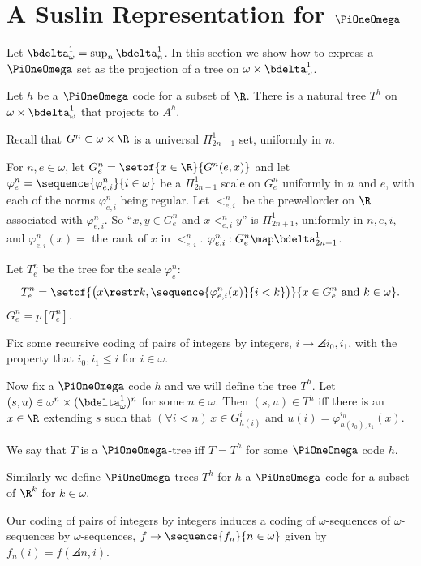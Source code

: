 \documentclass[oneside,12pt]{amsart}
\begin{document}
\section{A Suslin Representation for $\PiOneOmega$}
\label{section:suslinrep}

Let $\bdelta^1_{\omega} = \sup_n \bdelta^1_n$. In this section we show how to
express a $\PiOneOmega$ set as the projection
of a tree on $\omega\times \bdelta^1_{\omega}$.

\begin{definition}
Let $h$ be a $\PiOneOmega$ code for a subset of $\R$.
There is a natural tree $T^{h}$ on $\omega\times\bdelta^1_{\omega}$ that projects to $A^h$.

Recall that $G^n\subset\omega\times\R$ is a universal $\Pi^1_{2n+1}$ set, uniformly in $n$.

For $n,e\in\omega$, let $G^n_e = \setof{x\in\R}{G^n(e, x)}$ and
let $\varphi^n_e = \sequence{\varphi^n_{e,i}}{i\in\omega}$ be a $\Pi^1_{2n+1}$ scale on $G^n_e$ uniformly in $n$ and $e$,
with each of the norms $\varphi^n_{e,i}$ being regular.
Let $<^n_{e,i}$ be the prewellorder on $\R$ associated with $\varphi^n_{e,i}$. So ``$x,y\in G^n_e$ and $x <^n_{e,i} y$'' is
$\Pi^1_{2n+1}$, uniformly in $n,e,i$, and $\varphi^n_{e,i}(x) = $ the rank of $x$ in $<^n_{e,i}$.
$\varphi^n_{e,i} : G^n_e \map \bdelta^1_{2n+1}$.

Let $T^n_e$ be the tree for the scale $\varphi^n_e$:
$$T^n_e = \setof{\left(x\restr k,\sequence{\varphi^n_{e,i}(x)}{i<k}\right)}{x\in G^n_e \text{ and } k\in\omega}.$$
$G^n_e=p[T^n_e]$.

Fix some recursive coding of pairs of integers by integers, $i\to\angles{i_0,i_1}$,
with the property that $i_0,i_1\leq i$ for $i\in\omega$.

Now fix a $\PiOneOmega$ code $h$ and we will define the tree $T^h$.
Let $(s,u) \in \omega^n\times(\bdelta^1_{\omega})^n$ for some $n\in\omega$. Then $(s,u)\in T^h$ iff there is an
$x\in\R$ extending $s$ such that $(\forall i<n)\, x\in G^{i}_{h(i)}$ and
$u(i)=\varphi^{i_0}_{h(i_0),i_1}(x)$.

We say that $T$ is a $\PiOneOmega$-tree iff $T=T^h$ for some $\PiOneOmega$ code $h$.

Similarly we define $\PiOneOmega$-trees $T^h$ for $h$ a $\PiOneOmega$ code for a
subset of $\R^k$ for $k\in\omega$.
\end{definition}

Our coding of pairs of integers by integers induces a coding of $\omega$-sequences of $\omega$-sequences
by $\omega$-sequences, $f\to\sequence{f_n}{n\in\omega}$ given by $f_n(i) = f(\angles{n,i})$.
\end{document}
